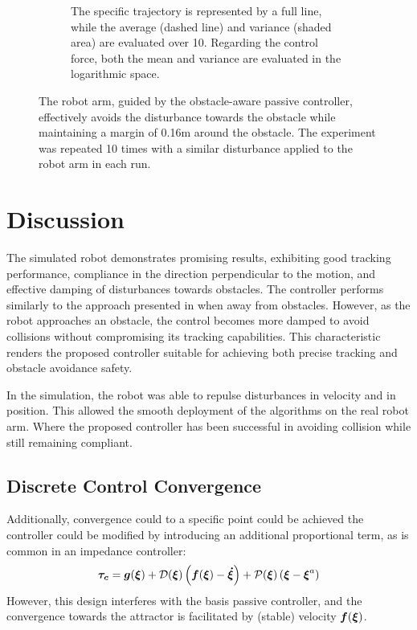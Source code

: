 \begin{figure}
\begin{subfigure}{\columnwidth}
      \caption{The specific trajectory is represented by a full line, while the average (dashed line) and variance (shaded area) are evaluated over 10.  Regarding the control force, both the mean and variance are evaluated in the logarithmic space.}
      \label{fig:trajectory_comparison_force_and_distance}
    \end{subfigure}
	\caption{
The robot arm, guided by the obstacle-aware passive controller, effectively avoids the disturbance towards the obstacle while maintaining a margin of 0.16m around the obstacle. The experiment was repeated 10 times with a similar disturbance applied to the robot arm in each run.
 }  
    \label{fig:evaluation_on_robot_arm}
\end{figure}

\section{Discussion}
The simulated robot demonstrates promising results, exhibiting good tracking performance, compliance in the direction perpendicular to the motion, and effective damping of disturbances towards obstacles. The controller performs similarly to the approach presented in \cite{kronander2015passive} when away from obstacles. However, as the robot approaches an obstacle, the control becomes more damped to avoid collisions without compromising its tracking capabilities. This characteristic renders the proposed controller suitable for achieving both precise tracking and obstacle avoidance safety.

In the simulation, the robot was able to repulse disturbances in velocity and in position. This allowed the smooth deployment of the algorithms on the real robot arm. Where the proposed controller has been successful in avoiding collision while still remaining compliant.

\subsection{Discrete Control Convergence}
Additionally, convergence could to a specific point could be achieved the controller could be modified by introducing an additional proportional term, as is common in an impedance controller:
\begin{equation}
	\vecs{\tau_c} = \vect g (\vecs\xi) 
	+ \matd{D}(\vecs\xi) \left(\vecs f(\vecs\xi) - \vecs{\dot\xi} \right) 
	+ \matd{P}(\vecs \xi) \left(\vecs \xi - \vecs \xi^a \right)
\label{eq:control_command}
\end{equation}
However, this design interferes with the basis passive controller, and the convergence towards the attractor is facilitated by (stable) velocity $\boldsymbol{f}(\boldsymbol{\xi})$. 


